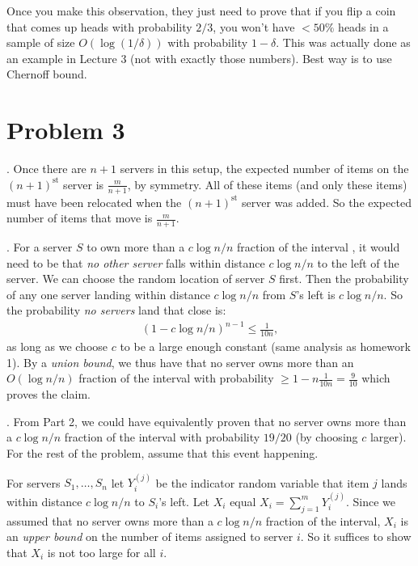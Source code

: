 \documentclass[11pt]{article}
\begin{document}
Once you make this observation, they just need to prove that if you flip a coin that comes up heads with probability $2/3$, you won't have $<50\%$ heads in a sample of size $O(\log(1/\delta))$ with probability $1-\delta$. This was actually done as an example in Lecture 3 (not with exactly those numbers). Best way is to use Chernoff bound.

\section*{Problem 3}
	\smallskip{}.\hspace{1em} 
	Once there are $n+1$ servers in this setup, the expected number of items on the $(n+1)^\text{st}$ server is $\frac{m}{n+1}$, by symmetry. All of these items (and only these items) must have been relocated when the $(n+1)^{\text{st}}$ server was added. So the expected number of items that move is $\frac{m}{n+1}$. 
	
	\smallskip{}. \hspace{1em} For a server $S$ to own more than a $c\log n/n$ fraction of the interval , it would need to be that \emph{no other server} falls within distance $c\log n/n$ to the left of the server. We can choose the random location of server $S$ first. Then the probability of any one server landing within distance $c\log n /n$ from $S$'s left is $c\log n / n$. So the probability \emph{no servers} land that close is:
	\begin{align*}
		(1 - c\log n / n)^{n-1} \leq \frac{1}{10n},
	\end{align*}
	as long as we choose $c$ to be a large enough constant (same analysis as homework 1). By a \emph{union bound}, we thus have that no server owns more than an $O(\log n / n)$ fraction of the interval with probability $\geq 1 - n\frac{1}{10 n} = \frac{9}{10}$ which proves the claim.
	
	\smallskip{}. \hspace{1em}
	From Part 2, we could have equivalently proven that no server owns more than a $c\log n / n$ fraction of the interval with probability $19/20$ (by choosing $c$ larger). For the rest of the problem, assume that this event happening.
	
	For servers $S_1, \ldots, S_n$ let $Y_i^{(j)}$ be the indicator random variable that item $j$ lands within distance $c\log n / n$ to $S_i$'s left. 
	Let $X_i$ equal $X_i = \sum_{j=1}^m Y_i^{(j)}$.
	Since we assumed that no server owns more than a $c\log n / n$ fraction of the interval, $X_i$ is an \emph{upper bound} on the number of items assigned to server $i$. So it suffices to show that $X_i$ is not too large for all $i$. 
	
\end{document}
